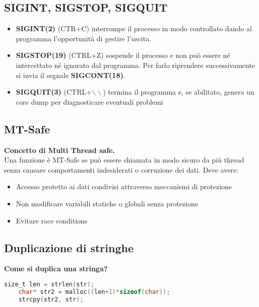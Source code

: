 \subsection{SIGINT, SIGSTOP, SIGQUIT}
\begin{itemize}
	\item \textbf{SIGINT(2)} (CTR+C) interrompe il processo in modo controllato dando al programma l'opportunità di gestire l'uscita.
	\item \textbf{SIGSTOP(19)} (CTRL+Z) sospende il processo e non può essere né intercettato né ignorato dal programma. Per farlo riprendere successivamente si invia il segnale \textbf{SIGCONT(18)}.
	\item \textbf{SIGQUIT(3)} (CTRL+$\backslash\backslash$) termina il programma e, se abilitato, genera un core dump per diagnosticare eventuali problemi
\end{itemize}

\subsection{MT-Safe}
\textbf{Concetto di Multi Thread safe.}\\
Una funzione è MT-Safe se può essere chiamata in modo sicuro da più thread senza causare comportamenti indesiderati o corruzione dei dati. Deve avere:
\begin{itemize}
	\item Accesso protetto ai dati condivisi attraverso meccanismi di protezione
	\item Non modificare variabili statiche o globali senza protezione
	\item Evitare race conditions
\end{itemize}

\subsection{Duplicazione di stringhe}
\textbf{Come si duplica una stringa?}\\
\begin{lstlisting}[language=C]
	size_t len = strlen(str);
	char* str2 = malloc((len+1)*sizeof(char));
	strcpy(str2, str);
\end{lstlisting}
